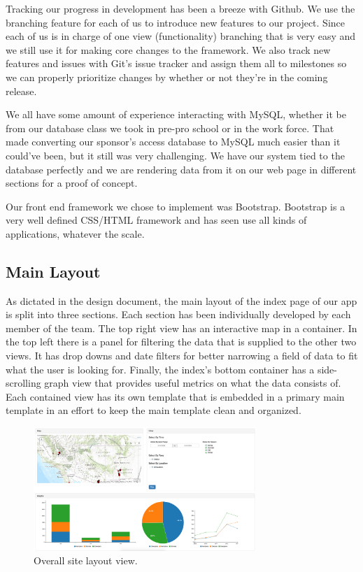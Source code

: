 \documentclass[10pt,peerreview,onecolumn,draftclsnofoot,technote]{IEEEtran}
\begin{document}
Tracking our progress in development has been a breeze with Github.
We use the branching feature for each of us to introduce new features to our project.
Since each of us is in charge of one view (functionality) branching that is very easy and we still use it for making core changes to the framework.
We also track new features and issues with Git’s issue tracker and assign them all to milestones so we can properly prioritize changes by whether or not they’re in the coming release.

We all have some amount of experience interacting with MySQL, whether it be from our database class we took in pre-pro school or in the work force. That made converting our sponsor’s access database to MySQL much easier than it could’ve been, but it still was very challenging.
We have our system tied to the database perfectly and we are rendering data from it on our web page in different sections for a proof of concept.

Our front end framework we chose to implement was Bootstrap.
Bootstrap is a very well defined CSS/HTML framework and has seen use all kinds of applications, whatever the scale.

\subsection{Main Layout} %
As dictated in the design document, the main layout of the index page of our app is split into three sections.
Each section has been individually developed by each member of the team.
The top right view has an interactive map in a container.
In the top left there is a panel for filtering the data that is supplied to the other two views.
It has drop downs and date filters for better narrowing a field of data to fit what the user is looking for.
Finally, the index’s bottom container has a side-scrolling graph view that provides useful metrics on what the data consists of.
Each contained view has its own template that is embedded in a primary main template in an effort to keep the main template clean and organized.

\begin{figure}[h]
\centering
\includegraphics[width=0.75\textwidth]{images/figure_1.jpg}
\captionsetup{justification=centering}
\caption{Overall site layout view.}
\end{figure}
\end{document}
